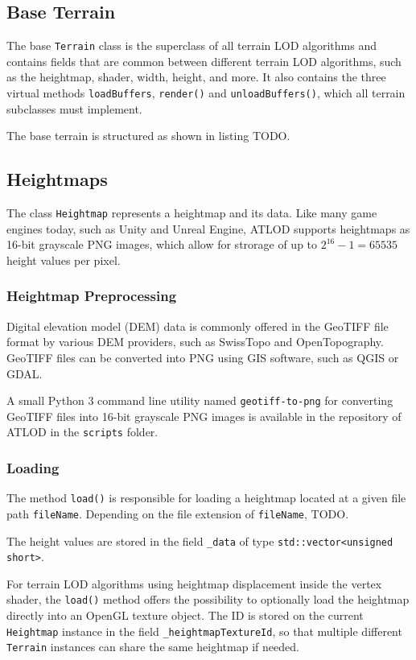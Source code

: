 \subsection{Base Terrain}
The base \texttt{Terrain} class is the superclass of all terrain LOD algorithms and 
contains fields that are common between different terrain LOD algorithms,
such as the heightmap, shader, width, height, and more.
It also contains the three virtual methods \texttt{loadBuffers}, \texttt{render()}
and \texttt{unloadBuffers()}, which all terrain subclasses must implement.

The base terrain is structured as shown in listing TODO.

\subsection{Heightmaps}
The class \texttt{Heightmap} represents a heightmap and its data.
Like many game engines today, such as Unity and Unreal Engine, ATLOD supports heightmaps as 16-bit grayscale PNG images, which allow for 
strorage of up to $2^{16}-1=65535$ height values per pixel. 

\subsubsection{Heightmap Preprocessing}
Digital elevation model (DEM) data is commonly offered in the GeoTIFF file format by various DEM providers,
such as SwissTopo and OpenTopography.
GeoTIFF files can be converted into PNG using GIS software, such as 
QGIS or GDAL. 

A small Python 3 command line utility named \texttt{geotiff-to-png} for converting GeoTIFF files into 16-bit grayscale PNG images
is available in the repository of ATLOD in the \texttt{scripts} folder. 

\subsubsection{Loading}
The method \texttt{load()} is responsible for loading a heightmap
located at a given file path \texttt{fileName}.
Depending on the file extension of \texttt{fileName}, 
TODO.

The height values are stored in the field \texttt{\_data} of type \texttt{std::vector<unsigned short>}.

For terrain LOD algorithms using heightmap displacement inside the vertex shader, 
the \texttt{load()} method offers the possibility to optionally load the heightmap 
directly into an OpenGL texture object. The ID is stored on the current \texttt{Heightmap}
instance in the field \texttt{\_heightmapTextureId}, so that multiple different 
\texttt{Terrain} instances can share the same heightmap if needed.

